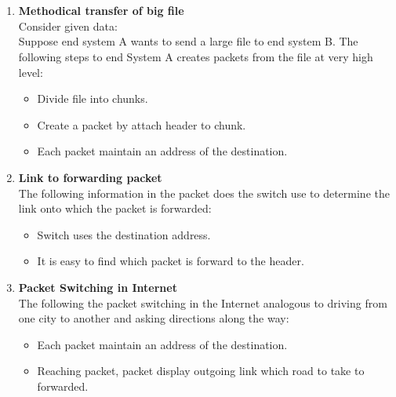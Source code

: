 \documentclass[12pt]{article}
\begin{document}
\section{}
    \begin{enumerate}[label=(\alph*)]
    \item \textbf{Methodical transfer of big file} \\
    Consider given data: \\
    Suppose end system A wants to send a large file to end system B. 
    The following steps to end System A creates packets from the file at very high level:
    \begin{itemize}
        \item Divide file into chunks.
        \item Create a packet by attach header to chunk.
        \item Each packet maintain an address of the destination.
    \end{itemize}
    
    \item \textbf{Link to forwarding packet} \\
    The following information in the packet does the switch use to determine the link onto which the packet is forwarded:
    \begin{itemize}
        \item Switch uses the destination address.
        \item It is easy to find which packet is forward to the header.
    \end{itemize}
    
    \item \textbf{Packet Switching in Internet} \\
    The following the  packet switching in the Internet analogous to driving from one city to another and asking directions along the way:
    \begin{itemize}
        \item Each packet maintain an address of the destination.
        \item Reaching packet, packet display outgoing link which road to take to forwarded.
    \end{itemize}
    
    \end{enumerate}
    
\end{document}
